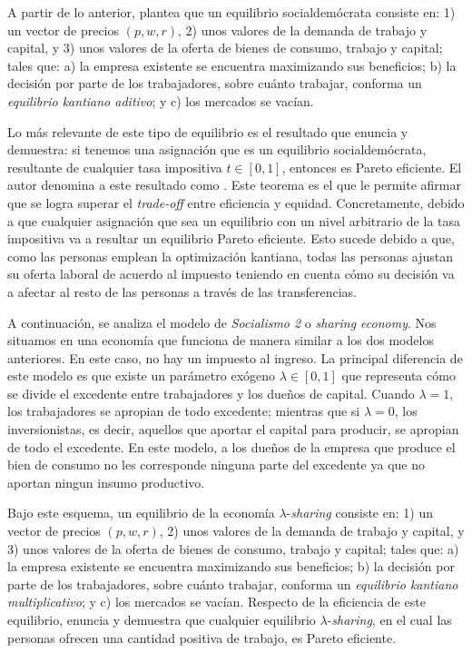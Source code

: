 A partir de lo anterior, \citet{Roemer_2021a} plantea que un equilibrio socialdemócrata consiste en: 1) un vector de precios $(p,w,r)$, 2) unos valores de la demanda de trabajo y capital, y 3) unos valores de la oferta de bienes de consumo, trabajo y capital; tales que: a) la empresa existente se encuentra maximizando sus beneficios; b) la decisión por parte de los trabajadores, sobre cuánto trabajar, conforma un \textit{equilibrio kantiano aditivo}; y c) los mercados se vacían. 

Lo más relevante de este tipo de equilibrio es el resultado que \citet[p. 579]{Roemer_2021a} enuncia y demuestra: si tenemos una asignación que es un equilibrio socialdemócrata, resultante de cualquier tasa impositiva $t \in [0,1]$, entonces es Pareto eficiente. El autor denomina a este resultado como . Este teorema es el que le permite afirmar que se logra superar el \textit{trade-off} entre eficiencia y equidad. Concretamente, debido a que cualquier asignación que sea un equilibrio con un nivel arbitrario de la tasa impositiva va a resultar un equilibrio Pareto eficiente. Esto sucede debido a que, como las personas emplean la optimización kantiana, todas las personas ajustan su oferta laboral de acuerdo al impuesto teniendo en cuenta cómo su decisión va a afectar al resto de las personas a través de las transferencias.

A continuación, se analiza el modelo de \textit{Socialismo 2} o \textit{sharing economy}. Nos situamos en una economía que funciona de manera similar a los dos modelos anteriores. En este caso, no hay un impuesto al ingreso. La principal diferencia de este modelo es que existe un parámetro exógeno $\lambda \in [0,1]$ que representa cómo se divide el excedente entre trabajadores y los dueños de capital. Cuando $\lambda = 1$, los trabajadores se apropian de todo excedente; mientras que si $\lambda = 0$, los inversionistas, es decir, aquellos que aportar el capital para producir, se apropian de todo el excedente. En este modelo, a los dueños de la empresa que produce el bien de consumo no les corresponde ninguna parte del excedente ya que no aportan ningun insumo productivo.

Bajo este esquema, un equilibrio de la economía $\lambda$-\textit{sharing} consiste en: 1) un vector de precios $(p,w,r)$, 2) unos valores de la demanda de trabajo y capital, y 3) unos valores de la oferta de bienes de consumo, trabajo y capital; tales que: a) la empresa existente se encuentra maximizando sus beneficios; b) la decisión por parte de los trabajadores, sobre cuánto trabajar, conforma un \textit{equilibrio kantiano multiplicativo}; y c) los mercados se vacían. Respecto de la eficiencia de este equilibrio, \citet[p. 584]{Roemer_2021a} enuncia y demuestra que cualquier equilibrio $\lambda$-\textit{sharing}, en el cual las personas ofrecen una cantidad positiva de trabajo, es Pareto eficiente.

